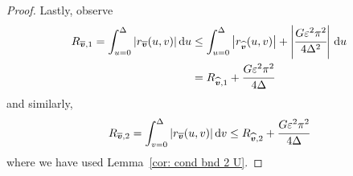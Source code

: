 \begin{proof}
	Lastly, observe 
	\begin{align*}
		R_{\overline{\boldsymbol v},1} = \int_{u=0}^\Delta |r_{\overline{\boldsymbol v}} (u,v) |\, \mathrm{d} u 
		&\leq \int_{u=0}^\Delta \left|r_{{\widehat{\boldsymbol v}}} (u,v) \right| + \left|\cfrac{G \varepsilon^2 \pi^2}{4\Delta^2}\right| \, \mathrm{d} u
		\\& = R_{{{\widehat{\boldsymbol v}}},1} + \cfrac{G \varepsilon^2 \pi^2}{4\Delta}
	\end{align*}
	and similarly, 
	\[R_{\overline{\boldsymbol v},2} = \int_{v=0}^\Delta |r_{\overline{\boldsymbol v}} (u,v) |\, \mathrm{d} v \leq R_{{{\widehat{\boldsymbol v}}},2} + \cfrac{G \varepsilon^2 \pi^2}{4\Delta}\]
	where we have used Lemma~\ref{cor: cond bnd 2 U}. 
\end{proof}
